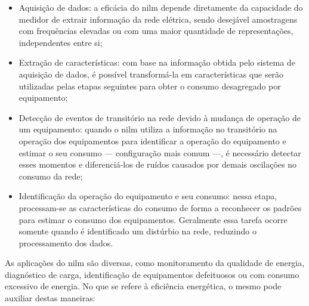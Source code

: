 \begin{itemize}
\item Aquisição de dados: a eficácia do \acs{nilm} depende diretamente
da capacidade do medidor de extrair informação da rede elétrica, sendo
desejável amostragens com frequências elevadas ou com uma maior
quantidade de representações, independentes entre si;
\item Extração de características: com base na informação obtida pelo
sistema de aquisição de dados, é possível transformá-la em
características que serão utilizadas pelas etapas seguintes para obter
o consumo desagregado por equipamento;
\item Detecção de eventos de transitório na rede devido à mudança de
operação de um equipamento: quando o \acs{nilm} utiliza a informação no
transitório na operação dos equipamentos para identificar a operação do
equipamento e estimar o seu consumo --- configuração mais comum ---, é
necessário detectar esses momentos e diferenciá-los de
ruídos causados por demais oscilações no consumo da rede;
\item Identificação da operação do equipamento e seu consumo:
nessa etapa, processam-se as características do consumo de forma a
reconhecer os padrões para estimar o consumo dos
equipamentos. Geralmente essa tarefa ocorre somente quando é
identificado um distúrbio na rede, reduzindo o processamento dos
dados.
\end{itemize}

As aplicações do \acs{nilm} são diversas, como monitoramento da
qualidade de energia, diagnóstico de carga, identificação de equipamentos
defeituosos ou com consumo excessivo de energia. No que se refere à
eficiência energética, o mesmo pode auxiliar destas maneiras:


